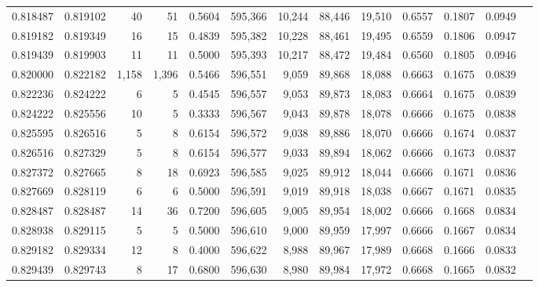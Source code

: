 \begin{tabular}{rrrrrrrrrrrrr}
0.818487 & 0.819102 &     40 &    51 &                                     0.5604 & 595,366 &  10,244 &  88,446 &  19,510 & 0.6557 & 0.1807 & 0.0949 \\
0.819182 & 0.819349 &     16 &    15 &                                     0.4839 & 595,382 &  10,228 &  88,461 &  19,495 & 0.6559 & 0.1806 & 0.0947 \\
0.819439 & 0.819903 &     11 &    11 &                                     0.5000 & 595,393 &  10,217 &  88,472 &  19,484 & 0.6560 & 0.1805 & 0.0946 \\
0.820000 & 0.822182 &  1,158 & 1,396 &                                     0.5466 & 596,551 &   9,059 &  89,868 &  18,088 & 0.6663 & 0.1675 & 0.0839 \\
0.822236 & 0.824222 &      6 &     5 &                                     0.4545 & 596,557 &   9,053 &  89,873 &  18,083 & 0.6664 & 0.1675 & 0.0839 \\
0.824222 & 0.825556 &     10 &     5 &                                     0.3333 & 596,567 &   9,043 &  89,878 &  18,078 & 0.6666 & 0.1675 & 0.0838 \\
0.825595 & 0.826516 &      5 &     8 &                                     0.6154 & 596,572 &   9,038 &  89,886 &  18,070 & 0.6666 & 0.1674 & 0.0837 \\
0.826516 & 0.827329 &      5 &     8 &                                     0.6154 & 596,577 &   9,033 &  89,894 &  18,062 & 0.6666 & 0.1673 & 0.0837 \\
0.827372 & 0.827665 &      8 &    18 &                                     0.6923 & 596,585 &   9,025 &  89,912 &  18,044 & 0.6666 & 0.1671 & 0.0836 \\
0.827669 & 0.828119 &      6 &     6 &                                     0.5000 & 596,591 &   9,019 &  89,918 &  18,038 & 0.6667 & 0.1671 & 0.0835 \\
0.828487 & 0.828487 &     14 &    36 &                                     0.7200 & 596,605 &   9,005 &  89,954 &  18,002 & 0.6666 & 0.1668 & 0.0834 \\
0.828938 & 0.829115 &      5 &     5 &                                     0.5000 & 596,610 &   9,000 &  89,959 &  17,997 & 0.6666 & 0.1667 & 0.0834 \\
0.829182 & 0.829334 &     12 &     8 &                                     0.4000 & 596,622 &   8,988 &  89,967 &  17,989 & 0.6668 & 0.1666 & 0.0833 \\
0.829439 & 0.829743 &      8 &    17 &                                     0.6800 & 596,630 &   8,980 &  89,984 &  17,972 & 0.6668 & 0.1665 & 0.0832 \\

\end{tabular}
